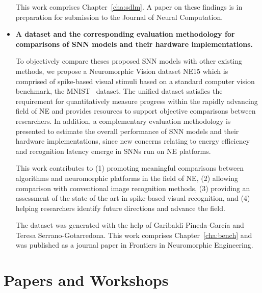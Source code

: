 \begin{itemize}
	This work comprises Chapter~\ref{cha:sdlm}.
	A paper on these findings is in preparation for submission to the Journal of Neural Computation.
	
	\item 
	\textbf{A dataset and the corresponding evaluation methodology for comparisons of SNN models and their hardware implementations.}
	
	To objectively compare theses proposed SNN models with other existing methods, we propose a Neuromorphic Vision dataset NE15 which is comprised of spike-based visual stimuli based on a standard computer vision benchmark, the MNIST~\citep{lecun1998gradient} dataset.
	The unified dataset satisfies the requirement for quantitatively measure progress within the rapidly advancing field of NE and provides resources to support objective comparisons between researchers.
	In addition, a complementary evaluation methodology is presented to estimate the overall performance of SNN models and their hardware implementations, since new concerns relating to energy efficiency and recognition latency emerge in SNNs run on NE platforms.
	
	This work contributes to (1) promoting meaningful comparisons between algorithms and neuromorphic platforms in the field of NE, (2) allowing comparison with conventional image recognition methods, (3) providing an assessment of the state of the art in spike-based visual recognition, and (4) helping researchers identify future directions and advance the field.
	
	The dataset was generated with the help of Garibaldi Pineda-Garc\'ia and Teresa Serrano-Gotarredona.
	This work comprises Chapter~\ref{cha:bench} and was published as a journal paper in Frontiers in Neuromorphic Engineering.
\end{itemize}

   
\section{Papers and Workshops}

